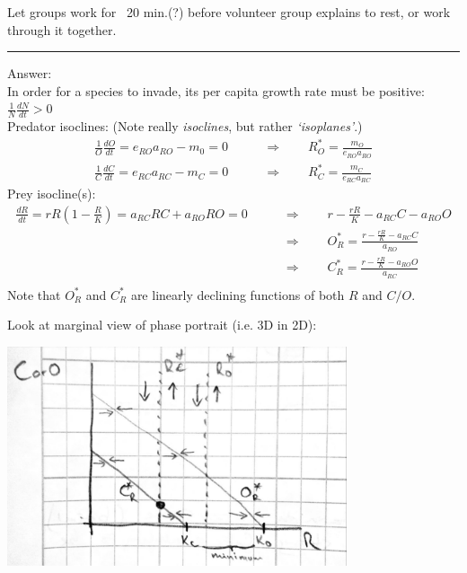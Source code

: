 \documentclass{article}
\newcommand{\note}[1]{\colorbox{gray!30}{#1}}
\begin{document}
\note{Let groups work for ~20 min.(?) before volunteer group explains to rest, or work through it together.}

\rule[0.5ex]{\linewidth}{1pt}
\pagebreak

\note{Answer:}\\
In order for a species to invade, its per capita growth rate must be positive:  $\frac{1}{N}\frac{dN}{dt}>0$\\

Predator isoclines: (Note really \emph{isoclines}, but rather \emph{`isoplanes'}.)
\begin{align*}
	\frac{1}{O}\frac{dO}{dt} = e_{RO}a_{RO}-m_0 = 0 & \qquad \Rightarrow  \qquad R_O^* = \frac{m_O}{e_{RO}a_{RO}}\\
	\frac{1}{C}\frac{dC}{dt} = e_{RC}a_{RC}-m_C = 0 & \qquad \Rightarrow  \qquad R_C^* = \frac{m_C}{e_{RC}a_{RC}}
\end{align*}
Prey isocline(s):
\begin{align*}
	\frac{dR}{dt}=rR\left(1-\frac{R}{K}\right) = a_{RC}RC + a_{RO}RO = 0  & \qquad \Rightarrow  \qquad r-\frac{rR}{K}-a_{RC}C - a_{RO}O\\
	& \qquad \Rightarrow  \qquad O_R^* = \frac{r-\tfrac{rR}{K}-a_{RC}C}{a_{RO}}\\
	& \qquad \Rightarrow  \qquad C_R^* = \frac{r-\tfrac{rR}{K}-a_{RO}O}{a_{RC}}\\
\end{align*}
Note that $O_R^*$ and $C_R^*$ are linearly declining functions of both $R$ and $C/O$.

Look at marginal view of phase portrait (i.e. 3D in 2D):
\begin{center}
 	\includegraphics[width=10cm]{figs/LVcomp.pdf}
\end{center}
\end{document}
